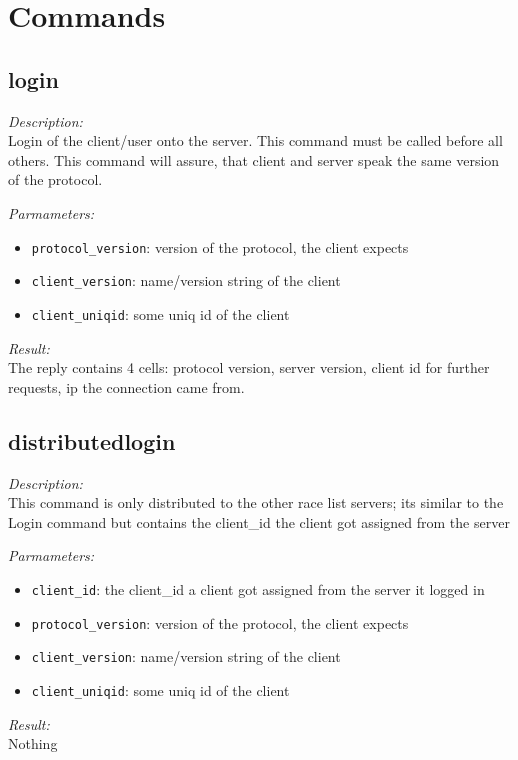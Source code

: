 \section{Commands}

\subsection{login}

\begin{description}
\item {\it Description:}\\
Login of the client/user onto the server. This command must be called before all others. This command will assure, that client and server speak the same version of the protocol.
\item {\it Parmameters:}
\begin{itemize}
\item {\tt protocol\_version}: version of the protocol, the client expects
\item {\tt client\_version}: name/version string of the client
\item {\tt client\_uniqid}: some uniq id of the client
\end{itemize}
\item {\it Result:}\\
The reply contains 4 cells: protocol version, server version, client id for further requests, ip the connection came from.
\end{description}

\subsection{distributedlogin}

\begin{description}
\item {\it Description:}\\
This command is only distributed to the other race list servers; its similar to the Login command but contains the client\_id the client got assigned from the server
\item {\it Parmameters:}
\begin{itemize}
\item {\tt client\_id}: the client\_id a client got assigned from the server it logged in
\item {\tt protocol\_version}: version of the protocol, the client expects
\item {\tt client\_version}: name/version string of the client
\item {\tt client\_uniqid}: some uniq id of the client
\end{itemize}
\item {\it Result:}\\
Nothing
\end{description}


